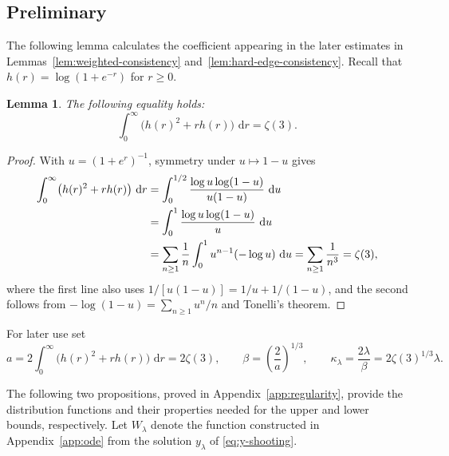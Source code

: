 \documentclass[a4paper,fleqn]{cas-sc}
\newif\ifshowrevisions
\DeclareRobustCommand{\rev}[1]{{\ifshowrevisions\color{blue}\fi#1}}
\newenvironment{revision}{\begingroup\ifshowrevisions\color{blue}\fi}{\endgroup}
\numberwithin{equation}{section}
\theoremstyle{plain}
\newtheorem{lemma}[theorem]{Lemma}
\theoremstyle{definition}
\newcommand{\dd}{\,\mathrm d}
\begin{document}
\subsection{Preliminary}

The following lemma calculates the coefficient appearing in the later
estimates in Lemmas~\ref{lem:weighted-consistency}
and~\ref{lem:hard-edge-consistency}.
Recall that \(h(r)=\log(1+e^{-r})\) for \(r\ge0\).

\begin{lemma}
\label{lem:diffusion-coefficient}
The following equality holds:
\begin{equation*}
\rev{\int_0^\infty\bigl(h(r)^2+rh(r)\bigr)\,\dd r=\zeta(3).}
\end{equation*}

\end{lemma}
\begin{proof}
With $u=(1+e^r)^{-1}$, symmetry under $u\mapsto1-u$ gives
\[
\begin{revision}
\begin{aligned}
\int_0^\infty\bigl(h(r)^2+rh(r)\bigr)\,\dd r
 &=\int_0^{1/2}
   \frac{\log u\log(1-u)}{u(1-u)}\,\dd u
 \\&=\int_0^1\frac{\log u\log(1-u)}u\,\dd u\\
 &=\sum_{n\ge1}\frac1n
   \int_0^1u^{n-1}(-\log u)\,\dd u
 =\sum_{n\ge1}\frac1{n^3}
 =\zeta(3),
\end{aligned}
\end{revision}
\]
where the first line also uses
$1/[u(1-u)]=1/u+1/(1-u)$, and the second follows from
$-\log(1-u)=\sum_{n\ge1}u^n/n$ and Tonelli's theorem.
\end{proof}

For later use set
\begin{equation}
 a=2\int_0^\infty\bigl(h(r)^2+rh(r)\bigr)\,\dd r=2\zeta(3), \qquad
 \beta=\left(\frac2a\right)^{1/3},
 \qquad
 \kappa_{\lambda}=\frac{2\lambda}{\beta}=2\zeta(3)^{1/3}\lambda.
 \label{eq:beta-kappa}
\end{equation}


The following two propositions, proved in Appendix~\ref{app:regularity},
provide the distribution functions and their properties needed for the upper
and lower bounds, respectively.  Let $W_\lambda$ denote the function
constructed in Appendix~\ref{app:ode} from the solution $y_\lambda$ of
\eqref{eq:y-shooting}.
\end{document}
